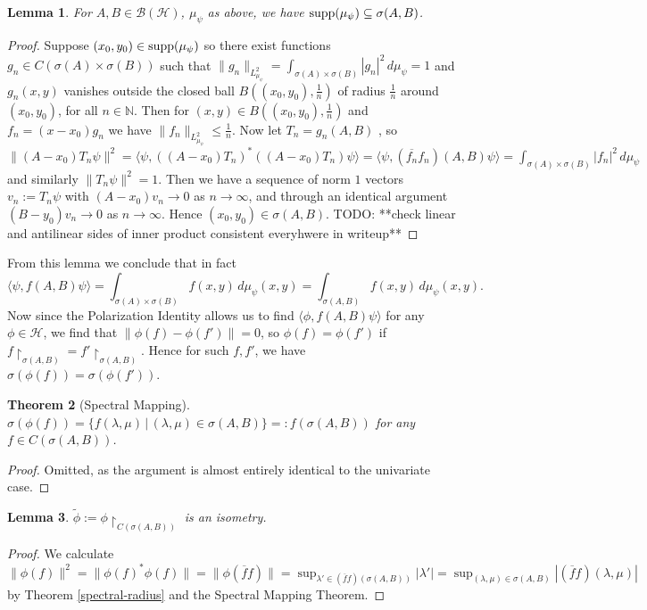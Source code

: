 \documentclass[12pt,oneside]{report}
\newtheorem{thm}{Theorem}[chapter]
\newtheorem{lem}[thm]{Lemma}
\begin{document}
 \begin{lem}
     For $A,B \in \mathscr{B}(\mathscr{H})$, $\mu_{\psi}$ as above, we have $\mathrm{supp}(\mu_{\psi}) \subseteq \sigma(A,B)$.
 \end{lem}
\begin{proof}
    Suppose $(x_{0},y_{0}) \in \mathrm{supp}(\mu_{\psi})$ so there exist functions $g_{n} \in C(\sigma(A) \times \sigma(B))$ such that $\|g_{n}\|_{L_{\mu_{\psi}}^{2}} = \int _{\sigma(A) \times \sigma(B)} |g_{n}|^{2} \, d\mu_{\psi} = 1$ and $g_{n}(x,y)$ vanishes outside the closed ball $B\left( (x_{0},y_{0}), \frac{1}{n} \right)$ of radius $\frac{1}{n}$ around $(x_{0},y_{0})$, for all $n \in \mathbb{N}$. Then for $(x,y) \in B\left( (x_{0},y_{0}), \frac{1}{n} \right)$ and $f_{n} = (x-x_{0})g_{n}$ we have $\|f_{n}\|_{L_{\mu_{\psi}}^{2}} \leq \frac{1}{n}$. Now let $T_{n} = g_{n}(A,B)$ , so $\|(A - x_{0})T_{n}\psi\|^{2} = \langle \psi, ((A - x_{0})T_{n})^{*}((A - x_{0})T_{n})\psi \rangle = \langle \psi,(\overline{f_{n}}f_{n})(A,B)\psi \rangle = \int _{\sigma(A) \times \sigma(B)} |f_{n}|^{2} \, d\mu_{\psi}$ and similarly $\|T_{n}\psi\|^{2} = 1$. Then we have a sequence of norm $1$ vectors $v_{n} := T_{n}\psi$ with $(A - x_{0})v_{n} \to 0$ as $n \to \infty$, and through an identical argument $(B - y_{0})v_{n} \to 0$ as $n \to \infty$. Hence $(x_{0},y_{0}) \in \sigma(A,B)$. TODO: **check linear and antilinear sides of inner product consistent everyhwere in writeup**
\end{proof}

From this lemma we conclude that in fact
$$\langle \psi, f(A,B)\psi \rangle = \int _{\sigma(A) \times \sigma(B)} f(x,y) \, d\mu_{\psi}(x,y) = \int _{\sigma(A,B)} f(x,y) \, d\mu_{\psi}(x,y).$$
Now since the Polarization Identity allows us to find $\langle \phi, f(A,B)\psi \rangle$ for any $\phi \in \mathscr{H}$, we find that $\|\phi(f) - \phi(f')\| = 0$, so $\phi(f) = \phi(f')$ if $f\restriction_{\sigma(A,B)} = f'\restriction_{\sigma(A,B)}$. Hence for such $f,f'$, we have $\sigma(\phi(f)) = \sigma(\phi(f'))$.

\begin{thm}[Spectral Mapping]
    $\sigma(\phi(f)) = \{ f(\lambda,\mu)  \, | \, (\lambda,\mu) \in \sigma(A,B) \} =: f(\sigma(A,B))$ for any $f \in C(\sigma(A,B))$.
\end{thm}
\begin{proof}
    Omitted, as the argument is almost entirely identical to the univariate case.
\end{proof}

\begin{lem}
    $\tilde{\phi} := \phi \restriction_{C(\sigma(A,B))}$ is an isometry.
\end{lem}
\begin{proof}
    We calculate $\|\phi(f)\|^{2} = \|\phi(f)^{*}\phi(f)\| = \|\phi(\overline{f}f)\| = \sup_{\lambda' \in (\overline{f}f)(\sigma(A,B))} |\lambda'| = \sup_{(\lambda,\mu) \in \sigma(A,B)} |(\overline{f}f)(\lambda,\mu)|$ by Theorem \ref{spectral-radius} and the Spectral Mapping Theorem.
\end{proof}
\end{document}

